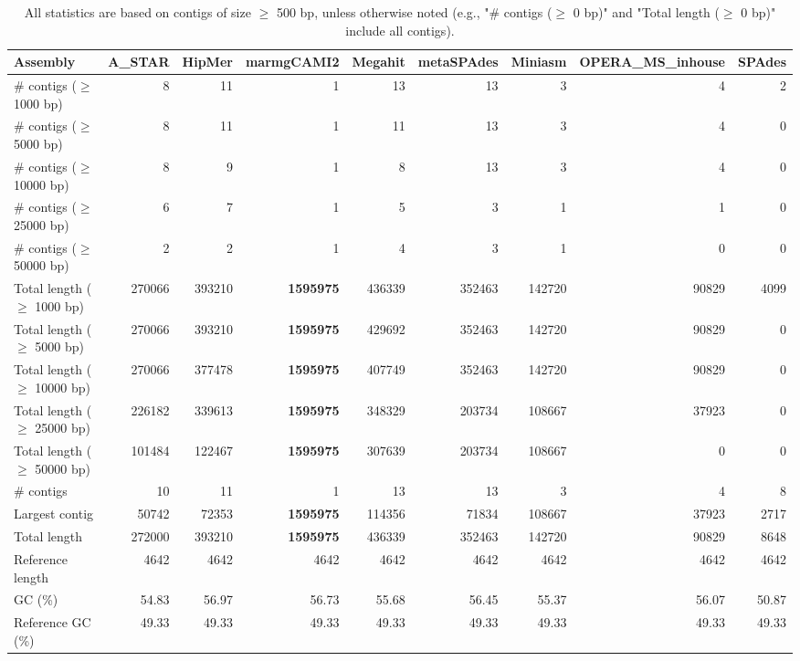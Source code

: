 \documentclass[12pt,a4paper]{article}
\begin{document}
\begin{table}[ht]
\begin{center}
\caption{All statistics are based on contigs of size $\geq$ 500 bp, unless otherwise noted (e.g., "\# contigs ($\geq$ 0 bp)" and "Total length ($\geq$ 0 bp)" include all contigs).}
\begin{tabular}{|l*{8}{|r}|}
\hline
Assembly & A\_STAR & HipMer & marmgCAMI2 & Megahit & metaSPAdes & Miniasm & OPERA\_MS\_inhouse & SPAdes \\ \hline
\# contigs ($\geq$ 1000 bp) & 8 & 11 & 1 & 13 & 13 & 3 & 4 & 2 \\ \hline
\# contigs ($\geq$ 5000 bp) & 8 & 11 & 1 & 11 & 13 & 3 & 4 & 0 \\ \hline
\# contigs ($\geq$ 10000 bp) & 8 & 9 & 1 & 8 & 13 & 3 & 4 & 0 \\ \hline
\# contigs ($\geq$ 25000 bp) & 6 & 7 & 1 & 5 & 3 & 1 & 1 & 0 \\ \hline
\# contigs ($\geq$ 50000 bp) & 2 & 2 & 1 & 4 & 3 & 1 & 0 & 0 \\ \hline
Total length ($\geq$ 1000 bp) & 270066 & 393210 & {\bf 1595975} & 436339 & 352463 & 142720 & 90829 & 4099 \\ \hline
Total length ($\geq$ 5000 bp) & 270066 & 393210 & {\bf 1595975} & 429692 & 352463 & 142720 & 90829 & 0 \\ \hline
Total length ($\geq$ 10000 bp) & 270066 & 377478 & {\bf 1595975} & 407749 & 352463 & 142720 & 90829 & 0 \\ \hline
Total length ($\geq$ 25000 bp) & 226182 & 339613 & {\bf 1595975} & 348329 & 203734 & 108667 & 37923 & 0 \\ \hline
Total length ($\geq$ 50000 bp) & 101484 & 122467 & {\bf 1595975} & 307639 & 203734 & 108667 & 0 & 0 \\ \hline
\# contigs & 10 & 11 & 1 & 13 & 13 & 3 & 4 & 8 \\ \hline
Largest contig & 50742 & 72353 & {\bf 1595975} & 114356 & 71834 & 108667 & 37923 & 2717 \\ \hline
Total length & 272000 & 393210 & {\bf 1595975} & 436339 & 352463 & 142720 & 90829 & 8648 \\ \hline
Reference length & 4642 & 4642 & 4642 & 4642 & 4642 & 4642 & 4642 & 4642 \\ \hline
GC (\%) & 54.83 & 56.97 & 56.73 & 55.68 & 56.45 & 55.37 & 56.07 & 50.87 \\ \hline
Reference GC (\%) & 49.33 & 49.33 & 49.33 & 49.33 & 49.33 & 49.33 & 49.33 & 49.33 \\ \hline

\end{tabular}
\end{center}
\end{table}
\end{document}
